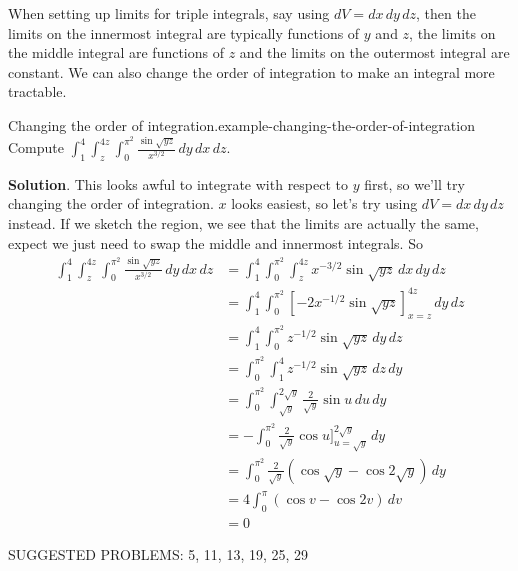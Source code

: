 \documentclass[10pt,]{book}
\numberwithin{equation}{section}
\begin{document}
\hypertarget{p-1516}{}%
When setting up limits for triple integrals, say using \(dV = dx\,dy\,dz\), then the limits on the innermost integral are typically functions of \(y\) and \(z\), the limits on the middle integral are functions of \(z\) and the limits on the outermost integral are constant. We can also change the order of integration to make an integral more tractable.%
\begin{example}{Changing the order of integration.}{example-changing-the-order-of-integration}%
\hypertarget{p-1517}{}%
Compute \(\int_{1}^{4}\int_{z}^{4z}\int_{0}^{\pi^{2}}\frac{\sin\sqrt{yz}}{x^{3/2}}\,dy\,dx\,dz\).%
\par\smallskip%
\noindent\textbf{Solution}.\hypertarget{solution-251}{}\quad%
\hypertarget{p-1518}{}%
This looks awful to integrate with respect to \(y\) first, so we'll try changing the order of integration. \(x\) looks easiest, so let's try using \(dV = dx\,dy\,dz\) instead. If we sketch the region, we see that the limits are actually the same, expect we just need to swap the middle and innermost integrals. So%
\begin{align*}
\int_{1}^{4}\int_{z}^{4z}\int_{0}^{\pi^{2}}\frac{\sin\sqrt{yz}}{x^{3/2}}\,dy\,dx\,dz  & = \int_{1}^{4}\int_{0}^{\pi^{2}}\int_{z}^{4z}x^{-3/2}\sin\sqrt{yz}\,dx\,dy\,dz \\
& = \int_{1}^{4}\int_{0}^{\pi^{2}}\left[-2x^{-1/2}\sin\sqrt{yz}\right]_{x=z}^{4z}\,dy\,dz \\
& = \int_{1}^{4}\int_{0}^{\pi^{2}}z^{-1/2}\sin\sqrt{yz}\,dy\,dz \\
& = \int_{0}^{\pi^{2}}\int_{1}^{4}z^{-1/2}\sin\sqrt{yz}\,dz\,dy \\
& = \int_{0}^{\pi^{2}}\int_{\sqrt{y}}^{2\sqrt{y}}\frac{2}{\sqrt{y}}\sin u\,du\,dy \\
& = -\int_{0}^{\pi^{2}}\frac{2}{\sqrt{y}}\cos u\bigg]_{u=\sqrt{y}}^{2\sqrt{y}}\,dy \\
& = \int_{0}^{\pi^{2}}\frac{2}{\sqrt{y}}(\cos\sqrt{y} - \cos2\sqrt{y})\,dy \\
& = 4\int_{0}^{\pi} (\cos v - \cos2v)\,dv \\
& = 0 
\end{align*}
%
\end{example}
\hypertarget{p-1519}{}%
SUGGESTED PROBLEMS: 5, 11, 13, 19, 25, 29%
%
%
\typeout{************************************************}
\typeout{************************************************}
%
\end{document}
